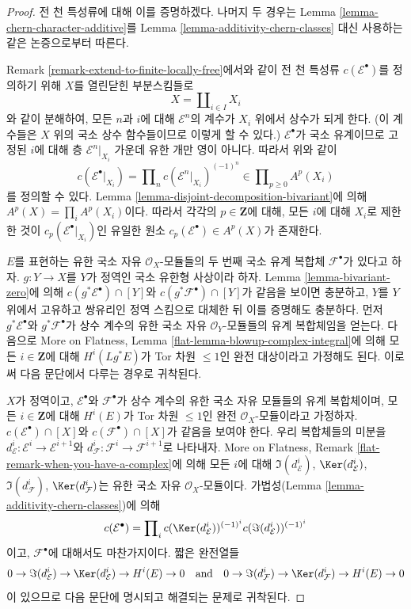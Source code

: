 \begin{proof}
전 천 특성류에 대해 이를 증명하겠다. 나머지 두 경우는 Lemma
\ref{lemma-chern-character-additive}를 Lemma
\ref{lemma-additivity-chern-classes} 대신 사용하는 같은 논증으로부터
따른다.

\medskip\noindent
Remark \ref{remark-extend-to-finite-locally-free}에서와 같이 전 천
특성류 $c(\mathcal{E}^\bullet)$를 정의하기 위해 $X$를 열린닫힌
부분스킴들로
$$
X = \coprod\nolimits_{i \in I} X_i
$$
와 같이 분해하여, 모든 $n$과 $i$에 대해 $\mathcal{E}^n$의 계수가
$X_i$ 위에서 상수가 되게 한다. (이 계수들은 $X$ 위의 국소 상수
함수들이므로 이렇게 할 수 있다.) $\mathcal{E}^\bullet$가 국소
유계이므로 고정된 $i$에 대해 층 $\mathcal{E}^n|_{X_i}$ 가운데
유한 개만 영이 아니다. 따라서 위와 같이
$$
c(\mathcal{E}^\bullet|_{X_i}) =
\prod\nolimits_n c(\mathcal{E}^n|_{X_i})^{(-1)^n}
\in \prod\nolimits_{p \geq 0} A^p(X_i)
$$
를 정의할 수 있다. Lemma
\ref{lemma-disjoint-decomposition-bivariant}에 의해
$A^p(X) = \prod_i A^p(X_i)$이다. 따라서 각각의
$p \in \mathbf{Z}$에 대해, 모든 $i$에 대해 $X_i$로 제한한 것이
$c_p(\mathcal{E}^\bullet|_{X_i})$인 유일한 원소
$c_p(\mathcal{E}^\bullet) \in A^p(X)$가 존재한다.

\medskip\noindent
$E$를 표현하는 유한 국소 자유 $\mathcal{O}_X$-모듈들의 두 번째
국소 유계 복합체 $\mathcal{F}^\bullet$가 있다고 하자.
$g : Y \to X$를 $Y$가 정역인 국소 유한형 사상이라 하자. Lemma
\ref{lemma-bivariant-zero}에 의해
$c(g^*\mathcal{E}^\bullet) \cap [Y]$와
$c(g^*\mathcal{F}^\bullet) \cap [Y]$가 같음을 보이면 충분하고,
$Y$를 $Y$ 위에서 고유하고 쌍유리인 정역 스킴으로 대체한 뒤 이를
증명해도 충분하다. 먼저 $g^*\mathcal{E}^\bullet$와
$g^*\mathcal{F}^\bullet$가 상수 계수의 유한 국소 자유
$\mathcal{O}_Y$-모듈들의 유계 복합체임을 얻는다. 다음으로 More on
Flatness, Lemma \ref{flat-lemma-blowup-complex-integral}에 의해 모든
$i \in \mathbf{Z}$에 대해 $H^i(Lg^*E)$가 Tor 차원 $\leq 1$인 완전
대상이라고 가정해도 된다. 이로써 다음 문단에서 다루는 경우로
귀착된다.

\medskip\noindent
$X$가 정역이고, $\mathcal{E}^\bullet$와
$\mathcal{F}^\bullet$가 상수 계수의 유한 국소 자유 모듈들의 유계
복합체이며, 모든 $i \in \mathbf{Z}$에 대해 $H^i(E)$가 Tor 차원
$\leq 1$인 완전 $\mathcal{O}_X$-모듈이라고 가정하자.
$c(\mathcal{E}^\bullet) \cap [X]$와
$c(\mathcal{F}^\bullet) \cap [X]$가 같음을 보여야 한다. 우리
복합체들의 미분을
$d_\mathcal{E}^i : \mathcal{E}^i \to \mathcal{E}^{i + 1}$와
$d_\mathcal{F}^i : \mathcal{F}^i \to \mathcal{F}^{i + 1}$로
나타내자. More on Flatness, Remark
\ref{flat-remark-when-you-have-a-complex}에 의해 모든 $i$에 대해
$\Im(d_\mathcal{E}^i)$, $\Ker(d_\mathcal{E}^i)$,
$\Im(d_\mathcal{F}^i)$, $\Ker(d_\mathcal{F}^i)$는 유한 국소 자유
$\mathcal{O}_X$-모듈이다. 가법성(Lemma
\ref{lemma-additivity-chern-classes})에 의해
$$
c(\mathcal{E}^\bullet) = \prod\nolimits_i
c(\Ker(d_\mathcal{E}^i))^{(-1)^i} c(\Im(d_\mathcal{E}^i))^{(-1)^i}
$$
이고, $\mathcal{F}^\bullet$에 대해서도 마찬가지이다. 짧은 완전열들
$$
0 \to \Im(d_\mathcal{E}^i) \to \Ker(d_\mathcal{E}^i) \to H^i(E) \to 0
\quad\text{and}\quad
0 \to \Im(d_\mathcal{F}^i) \to \Ker(d_\mathcal{F}^i) \to H^i(E) \to 0
$$
이 있으므로 다음 문단에 명시되고 해결되는 문제로 귀착된다.


\end{proof}
